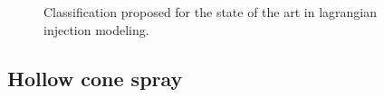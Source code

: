 %
%
%	
%	
%	
%	
%


\begin{figure}[h!]	
	\centering
	\caption{Classification proposed for the state of the art in lagrangian injection modeling.}
	\label{fig:state_art_injection}
\end{figure}

\subsection{Hollow cone spray}
\label{subsec:ch3_hollow_cone_spray}


